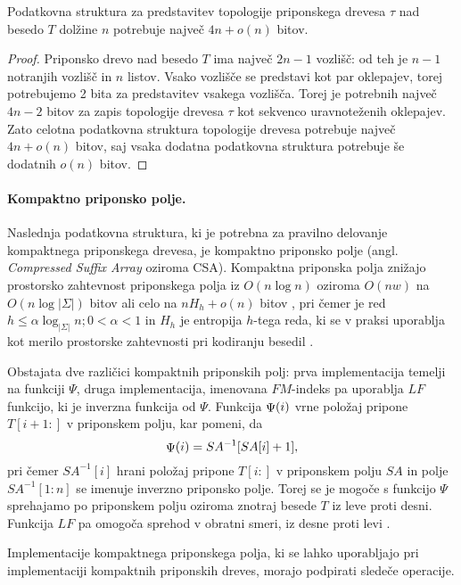 \begin{lema}\label{lema:BP}
 Podatkovna struktura za predstavitev topologije priponskega drevesa $\tau$ nad besedo $T$ dolžine $n$ potrebuje največ $4n+o(n)$ bitov.
\end{lema}

\begin{proof}
Priponsko drevo nad besedo $T$ ima največ $2n-1$ vozlišč: od teh je $n-1$ notranjih vozlišč in $n$ listov. Vsako vozlišče se predstavi kot par oklepajev, torej potrebujemo 2 bita za predstavitev vsakega vozlišča. Torej je potrebnih največ $4n-2$ bitov za zapis topologije drevesa $\tau$ kot sekvenco uravnoteženih oklepajev. Zato celotna podatkovna struktura topologije drevesa potrebuje največ $4n+o(n)$ bitov, saj vsaka dodatna podatkovna struktura potrebuje še dodatnih $o(n)$ bitov.
\end{proof}

\paragraph{Kompaktno priponsko polje.}
Naslednja podatkovna struktura, ki je potrebna za pravilno delovanje kompaktnega priponskega drevesa, je kompaktno priponsko polje (angl. \textit{Compressed Suffix Array} oziroma CSA). Kompaktna priponska polja znižajo prostorsko zahtevnost priponskega polja iz $O(n\log{n})$ oziroma $O(nw)$ na $O(n\log{|\Sigma|})$ bitov \cite{Grossi2000} ali celo na $nH_h +o(n)$ bitov \cite{Grossi2003}, pri čemer je red $h\le\alpha\log_{|\Sigma|}{n};0<\alpha<1$ in $H_h$ je entropija $h$-tega reda, ki se v praksi uporablja kot merilo prostorske zahtevnosti pri kodiranju besedil \cite{Navarro2016}.

Obstajata dve različici kompaktnih priponskih polj: prva implementacija temelji na funkciji $\Psi$, druga implementacija, imenovana $FM$-indeks pa uporablja $LF$ funkcijo, ki je inverzna funkcija od $\Psi$. Funkcija $ \mathop{\Psi}(i) $ vrne položaj pripone $T[i+1:]$ v priponskem polju, kar pomeni, da
$$
     \mathop{\Psi}(i) =SA^{-1}[SA[i]+1],
$$
pri čemer $SA^{-1}[i]$ hrani položaj pripone $T[i:]$ v priponskem polju $SA$ in polje $SA^{-1}[1:n]$ se imenuje inverzno priponsko polje. Torej se je mogoče s funkcijo $\Psi$ sprehajamo po priponskem polju oziroma znotraj besede $T$ iz leve proti desni. Funkcija $LF$ pa omogoča sprehod v obratni smeri, iz desne proti levi \cite{Navarro2016, Sadakane2007}.


Implementacije kompaktnega priponskega polja, ki se lahko uporabljajo pri implementaciji kompaktnih priponskih dreves, morajo podpirati sledeče operacije.

